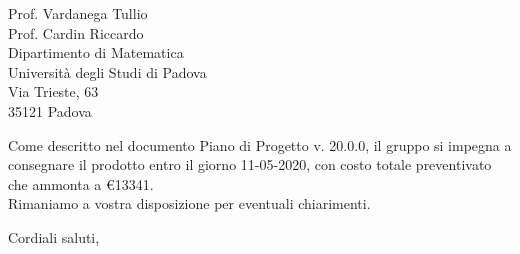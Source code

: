 \documentclass[a4paper,12pt]{letteracdp}
\begin{document}
\begin{letter}{
		Prof. Vardanega Tullio \\
		Prof. Cardin Riccardo \\
		Dipartimento di Matematica \\
		Università degli Studi di Padova \\
		Via Trieste, 63 \\
		35121 Padova}
	\begin{flushleft}
		\noindent Come descritto nel documento Piano di Progetto v. 20.0.0, il gruppo si impegna a consegnare il prodotto entro il giorno 11-05-2020, con costo totale preventivato che ammonta a \euro{13341}.
	\\
	
	Rimaniamo a vostra disposizione per eventuali chiarimenti.
	\end{flushleft}

	\closing{Cordiali saluti,}
	
\end{letter}	
\end{document}

